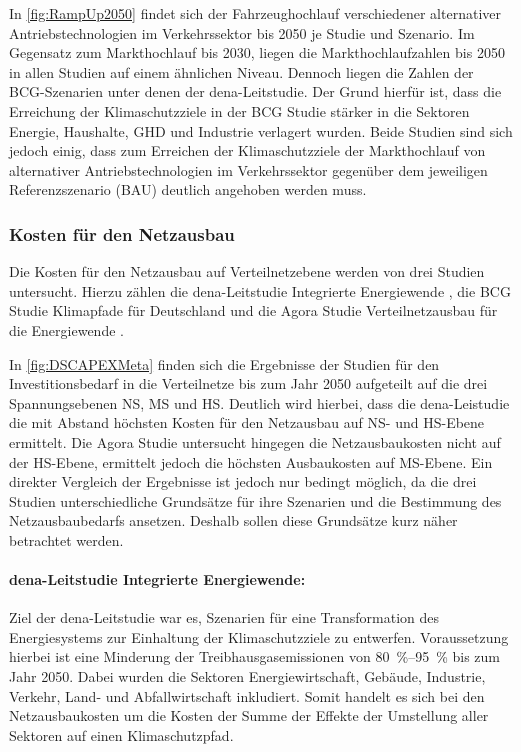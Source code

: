 In \autoref{fig:RampUp2050} findet sich der Fahrzeughochlauf verschiedener alternativer Antriebstechnologien im Verkehrssektor bis \num{2050} je Studie und Szenario.
Im Gegensatz zum Markthochlauf bis \num{2030}, liegen die Markthochlaufzahlen bis \num{2050} in allen Studien auf einem ähnlichen Niveau.
Dennoch liegen die Zahlen der BCG-Szenarien unter denen der dena-Leitstudie.
Der Grund hierfür ist, dass die Erreichung der Klimaschutzziele in der BCG Studie stärker in die Sektoren Energie, Haushalte, \gls{GHD} und Industrie verlagert wurden.
Beide Studien sind sich jedoch einig, dass zum Erreichen der Klimaschutzziele der Markthochlauf von alternativer Antriebstechnologien im Verkehrssektor gegenüber dem jeweiligen Referenzszenario (\gls{BAU}) deutlich angehoben werden muss.

\subsubsection{Kosten für den Netzausbau}

Die Kosten für den Netzausbau auf Verteilnetzebene werden von drei Studien untersucht.
Hierzu zählen die dena-Leitstudie \glqq Integrierte Energiewende\grqq{} \cite{DEAGH2018}, die BCG Studie \glqq Klimapfade für Deutschland\grqq{} \cite{BCG2018} und die Agora Studie \glqq Verteilnetzausbau für die Energiewende\grqq{} \cite{Agora2019}.



In \autoref{fig:DSCAPEXMeta} finden sich die Ergebnisse der Studien für den Investitionsbedarf in die Verteilnetze bis zum Jahr \num{2050} aufgeteilt auf die drei Spannungsebenen \gls{NS}, \gls{MS} und \gls{HS}.
Deutlich wird hierbei, dass die dena-Leistudie die mit Abstand höchsten Kosten für den Netzausbau auf \gls{NS}- und \gls{HS}-Ebene ermittelt.
Die Agora Studie untersucht hingegen die Netzausbaukosten nicht auf der \gls{HS}-Ebene, ermittelt jedoch die höchsten Ausbaukosten auf \gls{MS}-Ebene.
Ein direkter Vergleich der Ergebnisse ist jedoch nur bedingt möglich, da die drei Studien unterschiedliche Grundsätze für ihre Szenarien und die Bestimmung des Netzausbaubedarfs ansetzen.
Deshalb sollen diese Grundsätze kurz näher betrachtet werden.

\paragraph{dena-Leitstudie \glqq Integrierte Energiewende\grqq:}

Ziel der dena-Leitstudie war es, Szenarien für eine Transformation des Energiesystems zur Einhaltung der Klimaschutzziele zu entwerfen.
Voraussetzung hierbei ist eine Minderung der Treibhausgasemissionen von \SIrange[range-phrase=~{--}~]{80}{95}{\percent} bis zum Jahr \num{2050}.
Dabei wurden die Sektoren Energiewirtschaft, Gebäude, Industrie, Verkehr, Land- und
Abfallwirtschaft inkludiert.
Somit handelt es sich bei den Netzausbaukosten um die Kosten der Summe der Effekte der Umstellung aller Sektoren auf einen Klimaschutzpfad.\medskip

